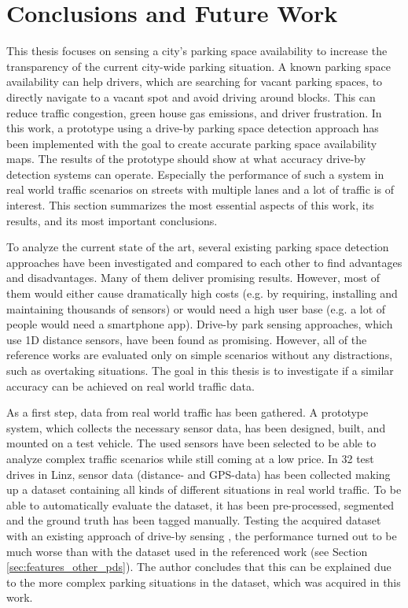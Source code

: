 \chapter{Conclusions and Future Work}
\label{chap:conclusion}



This thesis focuses on sensing a city's parking space availability to increase the transparency of the current city-wide parking situation. 
A known parking space availability can help drivers, which are searching for vacant parking spaces, to directly navigate to a vacant spot and avoid driving around blocks. This can reduce traffic congestion, green house gas emissions, and driver frustration. 
In this work, a prototype using a drive-by parking space detection approach has been implemented with the goal to create accurate parking space availability maps. The results of the prototype should show at what accuracy drive-by detection systems can operate. Especially the performance of such a system in real world traffic scenarios on streets with multiple lanes and a lot of traffic is of interest.
This section summarizes the most essential aspects of this work, its results, and its most important conclusions.



To analyze the current state of the art, several existing parking space detection approaches have been investigated and compared to each other to find advantages and disadvantages.
Many of them deliver promising results. However, most of them would either cause dramatically high costs (e.g. by requiring, installing and maintaining thousands of sensors) or would need a high user base (e.g. a lot of people would need a smartphone app). 
 Drive-by park sensing approaches, which use 1D distance sensors, have been found as promising. However, all of the reference works are evaluated only on simple scenarios without any distractions, such as overtaking situations. 
The goal in this thesis is to investigate if a similar accuracy can be achieved on real world traffic data.

As a first step, data from real world traffic has been gathered. A prototype system, which collects the necessary sensor data, has been designed, built, and mounted on a test vehicle. The used sensors have been selected to be able to analyze complex traffic scenarios while still coming at a low price. 
In 32 test drives in Linz, sensor data (distance- and GPS-data) has been collected making up a dataset containing all kinds of different situations in real world traffic. To be able to automatically evaluate the dataset, it has been pre-processed, segmented and the ground truth has been tagged manually. 
Testing the acquired dataset with an existing approach of drive-by sensing \cite{Mathur:2010:PDS:1814433.1814448}, the performance turned out to be much worse than with the dataset used in the referenced work (see Section \ref{sec:features_other_pds}). The author concludes that this can be explained due to the more complex parking situations in the dataset, which was acquired in this work. 

